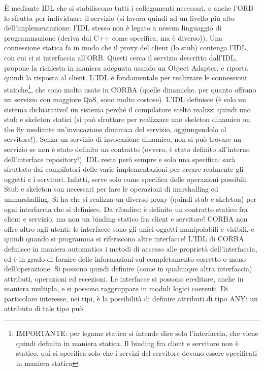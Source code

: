 È mediante IDL che si stabiliscono tutti i collegamenti necessari, e anche l'ORB lo sfrutta per individuare il servizio
(si lavora quindi ad un livello più alto dell'implementazione: l'IDL stesso non è legato a nessun linguaggio di
programmazione (deriva dal C++ come specifica, ma è diverso)). Una connessione statica fa in modo che il proxy del
client (lo stub) contenga l'IDL, con cui ci si interfaccia all'ORB. Questi cerca il servizio descritto dall'IDL, propone
la richiesta in maniera adeguata usando un Object Adapter, e riporta quindi la risposta al client.
L'IDL è fondamentale per realizzare le connessioni statiche\footnote{IMPORTANTE: per legame statico si intende dire solo
l'interfaccia, che viene quindi definita in maniera statica. Il binding fra client e servitore non è statico, qui si
specifica solo che i servizi del servitore devono essere specificati in maniera statica}, che sono molto usate in CORBA
(quelle dinamiche, per quanto offrano un servizio con maggiore QoS, sono molto costose). L'IDL definisce (è solo un
sistema dichiarativo! un sistema perché il compilatore scelto realizzi quindi uno stub e skeleton statici (si può
sfruttare per realizzare uno skeleton dinamico on the fly mediante un'invocazione dinamica del servizio, aggiungendolo
al servitore!). Senza un servizio di invocazione dinamico, non si può trovare un servizio se non è stato definito un
contratto (ovvero, è stato definito all'interno dell'interface repository!).
IDL resta però sempre e solo una specifica: sarà sfruttato dai compilatori delle varie implementazioni per creare
realmente gli oggetti e i servitori. Infatti, serve solo come specifica delle operazioni possibili.
Stub e skeleton son necessari per fare le operazioni di marshalling ed unmarshalling. Si ha che si realizza un diverso
proxy (quindi stub e skeleton) per ogni interfaccia che si definisce.
Da ribadire: è definito un contratto statico fra client e servizio, ma non un binding statico fra client e servitore!
CORBA non offre altro agli utenti: le interfacce sono gli unici oggetti manipolabili e visibili, e quindi quando si
programma si riferiscono altre interfacce!
L'IDL di CORBA definisce in maniera automatica i metodi di accesso alle proprietà dell'interfaccia, ed è in grado di
fornire delle informazioni sul completamento corretto o meno dell'operazione. Si possono quindi definire (come
in qualunque altra interfaccia) attributi, operazioni ed eccezioni. Le interfacce si possono ereditare, anche in maniera
multipla, e si possono raggruppare in moduli logici coerenti.
Di particolare interesse, nei tipi, è la possibilità di definire attributi di tipo ANY: un attributo di tale tipo può
